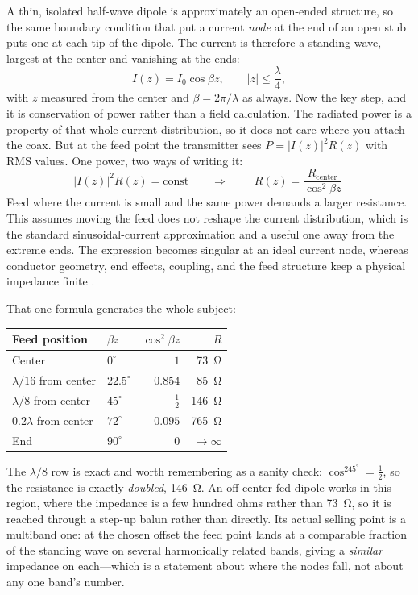A thin, isolated half-wave dipole is approximately an open-ended structure, so the same boundary condition that put
a current \emph{node} at the end of an open stub puts one at each tip of the dipole.
The current is therefore a standing wave, largest at the center and vanishing at the
ends:
\[
I(z)=I_0\cos\beta z,
\qquad |z|\le\frac{\lambda}{4},
\]
with \(z\) measured from the center and \(\beta=2\pi/\lambda\) as always. Now the key
step, and it is conservation of power rather than a field calculation. The radiated
power is a property of that whole current distribution, so it does not care where you
attach the coax. But at the feed point the transmitter sees
\(P=|I(z)|^2R(z)\) with RMS values. One power, two ways of writing it:
\[
|I(z)|^2R(z)=\text{const}
\qquad\Longrightarrow\qquad
\boxed{\;R(z)=\frac{R_{\text{center}}}{\cos^2\beta z}\;}
\]
Feed where the current is small and the same power demands a larger resistance. This
assumes moving the feed does not reshape the current distribution, which is the
standard sinusoidal-current approximation and a useful one away from the extreme ends.
The expression becomes singular at an ideal current node, whereas conductor geometry,
end effects, coupling, and the feed structure keep a physical impedance finite
\cite[pp.~367--376]{free2022rfmicrowave}.

That one formula generates the whole subject:

\begin{center}
\begin{tabular}{@{}llrr@{}}
\toprule
Feed position & \(\beta z\) & \(\cos^2\beta z\) & \(R\) \\
\midrule
Center & \(0^\circ\) & \(1\) & \SI{73}{\ohm} \\
\(\lambda/16\) from center & \(22.5^\circ\) & \(0.854\) & \SI{85}{\ohm} \\
\(\lambda/8\) from center & \(45^\circ\) & \(\tfrac12\) & \SI{146}{\ohm} \\
\(0.2\lambda\) from center & \(72^\circ\) & \(0.095\) & \SI{765}{\ohm} \\
End & \(90^\circ\) & \(0\) & \(\to\infty\) \\
\bottomrule
\end{tabular}
\end{center}

The \(\lambda/8\) row is exact and worth remembering as a sanity check:
\(\cos^245^\circ=\tfrac12\), so the resistance is exactly \emph{doubled}, \SI{146}{\ohm}.
An off-center-fed dipole works in this region, where the impedance is a few hundred
ohms rather than \SI{73}{\ohm}, so it is reached through a step-up balun rather than
directly. Its actual selling point is a multiband one: at the chosen offset the feed
point lands at a comparable fraction of the standing wave on several harmonically
related bands, giving a \emph{similar} impedance on each---which is a statement about
where the nodes fall, not about any one band's number.

